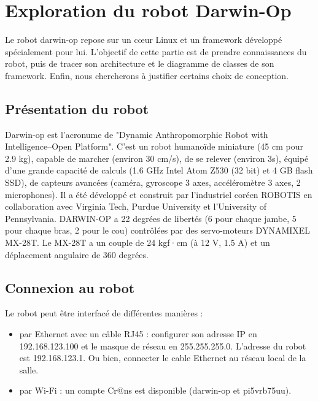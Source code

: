 \documentclass[abstracton]{scrartcl}
\begin{document}
\lstset{language=C++}




\section{Exploration du robot Darwin-Op}
\label{sec:exploration}

Le robot darwin-op repose sur un cœur Linux et un \gls{framework} développé spécialement pour lui. L'objectif de cette partie est de prendre connaissances du robot, puis de tracer son architecture et le diagramme de classes de son framework. Enfin, nous chercherons à justifier certains choix de conception.


\subsection{Présentation du robot}

Darwin-op est l'acronume de "Dynamic Anthropomorphic Robot with Intelligence–Open Platform". C'est un robot humanoïde miniature (45 cm pour 2.9 kg), capable de marcher (environ 30 cm/s), de se relever (environ 3s), équipé d'une grande capacité de calculs (1.6 GHz Intel Atom Z530 (32 bit) et 4 GB flash SSD), de capteurs avancées (caméra, gyroscope 3 axes, accéléromètre 3 axes, 2 microphones). Il a été développé et construit par l'industriel coréen ROBOTIS en collaboration avec Virginia Tech, Purdue University et l'University of Pennsylvania. DARWIN-OP a 22 degrées de libertés (6 pour chaque jambe, 5 pour chaque bras, 2 pour le cou) contrôlées par des servo-moteurs DYNAMIXEL MX-28T. Le MX-28T a un couple de 24 kgf·cm (à 12 V, 1.5 A) et un déplacement angulaire de 360 degrées.


\subsection{Connexion au robot}

Le robot peut être interfacé de différentes manières :
\begin{itemize}
    \item  par Ethernet avec un câble RJ45 :
    configurer son adresse IP en 192.168.123.100 et le masque de réseau en 255.255.255.0.
    L'adresse du robot est 192.168.123.1.
    Ou bien,  connecter le cable Ethernet au réseau local de la salle.
    \item  par Wi-Fi : un compte Cr@ns est disponible (darwin-op et pi5vrb75uu).
\end{itemize}
\end{document}
